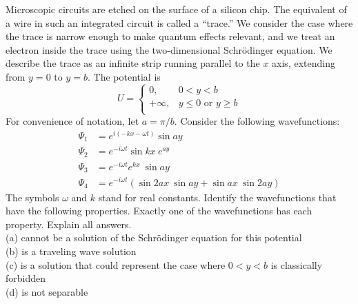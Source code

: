   Microscopic circuits are etched on the surface of a silicon chip. The equivalent of a wire
  in such an integrated circuit is called a ``trace.'' We consider the case
  where the trace is narrow enough to make quantum effects relevant, and we treat
  an electron inside the trace using the two-dimensional Schr\"odinger equation.
  We describe the trace as an infinite strip running parallel to the $x$ axis, extending
  from $y=0$ to $y=b$. The potential is
  \begin{equation*}
    U = \begin{cases}
      0, & 0<y< b \\
      +\infty, & y\le 0 \text{\ or\ } y\ge b \\
    \end{cases}
  \end{equation*}
 For convenience of notation, let $a=\pi/b$. Consider the following wavefunctions:
  \begin{align*}
    \Psi_1 &= e^{i(-kx-\omega t)}\sin ay \\
    \Psi_2 &= e^{-i\omega t}\sin kx\:e^{ay} \\
    \Psi_3 &= e^{-i\omega t}e^{kx}\:\sin ay \\
    \Psi_4 &= e^{-i\omega t}(\sin 2ax\:\sin ay+\sin ax\:\sin 2ay)
  \end{align*}
  The symbols $\omega$ and $k$ stand for real constants.
  Identify the wavefunctions that have the following properties. Exactly one of the wavefunctions
  has each property. Explain all answers.\\
  (a) cannot be a solution of the Schr\"odinger equation for this potential\\
  (b) is a traveling wave solution\\
  (c) is a solution that could represent the case where $0<y<b$ is classically forbidden\\
  (d) is not separable


